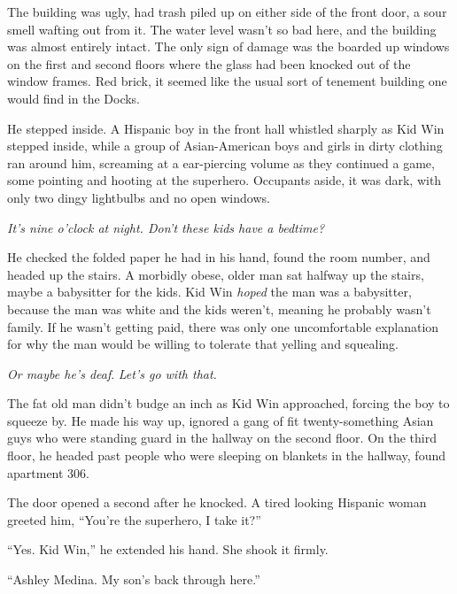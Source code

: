 The building was ugly, had trash piled up on either side of the front door, a sour smell wafting out from it.  The water level wasn't so bad here, and the building was almost entirely intact.  The only sign of damage was the boarded up windows on the first and second floors where the glass had been knocked out of the window frames.  Red brick, it seemed like the usual sort of tenement building one would find in the Docks.



He stepped inside.  A Hispanic boy in the front hall whistled sharply as Kid Win stepped inside, while a group of Asian-American boys and girls in dirty clothing ran around him, screaming at a ear-piercing volume as they continued a game, some pointing and hooting at the superhero.  Occupants aside, it was dark, with only two dingy lightbulbs and no open windows.



\emph{It's nine o'clock at night.  Don't these kids have a bedtime?}



He checked the folded paper he had in his hand, found the room number, and headed up the stairs.  A morbidly obese, older man sat halfway up the stairs, maybe a babysitter for the kids.  Kid Win \emph{hoped} the man was a babysitter, because the man was white and the kids weren't, meaning he probably wasn't family.  If he wasn't getting paid, there was only one uncomfortable explanation for why the man would be willing to tolerate that yelling and squealing.



\emph{Or maybe he's deaf}.  \emph{Let's go with that.}



The fat old man didn't budge an inch as Kid Win approached, forcing the boy to squeeze by.  He made his way up, ignored a gang of fit twenty-something Asian guys who were standing guard in the hallway on the second floor.  On the third floor, he headed past people who were sleeping on blankets in the hallway, found apartment 306.



The door opened a second after he knocked.  A tired looking Hispanic woman greeted him, ``You're the superhero, I take it?''



``Yes.  Kid Win,'' he extended his hand.  She shook it firmly.



``Ashley Medina.  My son's back through here.''



